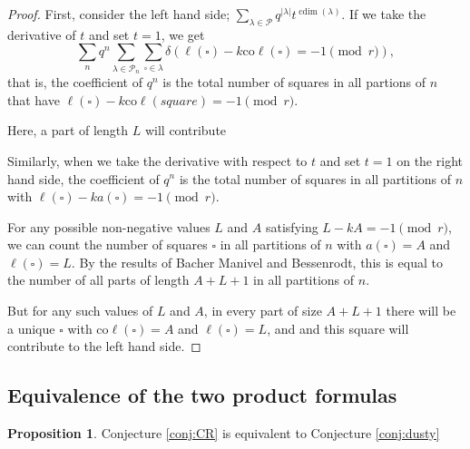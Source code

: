 \documentclass{amsart}[12pt]
\theoremstyle{definition}
\newtheorem{proposition}[dummy]{Proposition}
\newcommand{\PP}{\mathcal{P}} %
\newcommand{\coleg}{\text{co}\ell}
\DeclareMathOperator{\cdim}{cdim}
\begin{document}
\begin{proof}
First, consider the left hand side; $\sum_{\lambda\in\PP} q^{|\lambda|} t^{\cdim(\lambda)}$.  If we take the derivative of $t$ and set $t=1$, we get 
$$\sum_{n} q^n\sum_{\lambda\in\PP_n}\sum_{\square\in\lambda} \delta(\ell(\square)-k\coleg(\square)=-1\pmod r),$$
that is, the coefficient of $q^n$ is the total number of squares in all partions of $n$ that have $\ell(\square)-k\coleg(square)=-1\pmod r$.  

  Here, a part of length $L$ will contribute 

Similarly, when we take the derivative with respect to $t$ and set $t=1$ on the right hand side, the coefficient of $q^n$ is the total number of squares in all partitions of $n$ with $\ell(\square)-k a(\square)=-1\pmod r$. 

For any possible non-negative values $L$ and $A$ satisfying $L-kA=-1\pmod r$, we can count the number of squares $\square$ in all partitions of $n$ with $a(\square)=A$ and $\ell(\square)=L$.  By the results of Bacher Manivel and Bessenrodt, this is equal to the number of all parts of length $A+L+1$ in all partitions of $n$.  

But for any such values of $L$ and $A$, in every part of size $A+L+1$ there will be a unique $\square$ with $\coleg(\square)=A$ and $\ell(\square)=L$, and and this square will contribute to the left hand side.


\end{proof}



\subsection{Equivalence of the two product formulas}
\label{sec:prod-equiv}

\begin{proposition}
Conjecture \ref{conj:CR} is equivalent to Conjecture \ref{conj:dusty}
\end{proposition}
\end{document}
